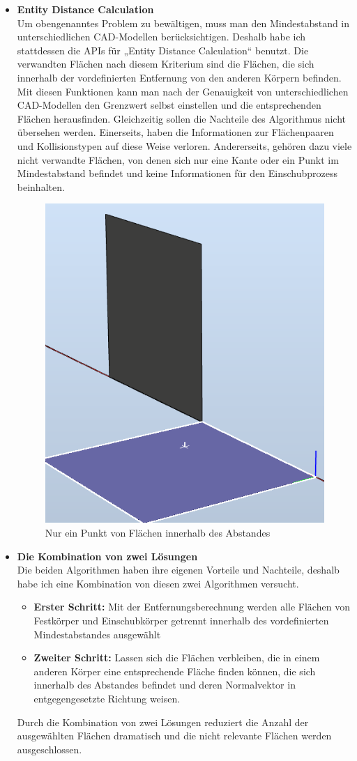 \documentclass[14pt,a4paper,titlepage]{article}
\begin{document}
\begin{itemize}
				 
				\item 
				\textbf{Entity Distance Calculation}
				\\ 
				Um obengenanntes Problem zu bewältigen, muss man den Mindestabstand in unterschiedlichen CAD-Modellen berücksichtigen. Deshalb habe ich stattdessen die APIs für „Entity Distance Calculation“ benutzt. Die verwandten Flächen nach diesem Kriterium sind die Flächen, die sich innerhalb der vordefinierten Entfernung von den anderen Körpern befinden. 
				\bigbreak
				Mit diesen Funktionen kann man nach der Genauigkeit von unterschiedlichen CAD-Modellen den Grenzwert selbst einstellen und die entsprechenden Flächen herausfinden. Gleichzeitig sollen die Nachteile des Algorithmus nicht übersehen werden. Einerseits, haben die Informationen zur Flächenpaaren und Kollisionstypen auf diese Weise verloren. Andererseits, gehören dazu viele nicht verwandte Flächen, von denen sich nur eine Kante oder ein Punkt im Mindestabstand befindet und keine Informationen für den Einschubprozess beinhalten. 
					\begin{figure}[h!]
					\centering
					\includegraphics[width=0.3\linewidth]{faces.png}
					\caption{Nur ein Punkt von Flächen innerhalb des Abstandes}
				\end{figure} 
				\pagebreak
				\item 
				\textbf{Die Kombination von zwei Lösungen} 
				\\
				Die beiden Algorithmen haben ihre eigenen Vorteile und Nachteile, deshalb habe ich eine Kombination von diesen zwei Algorithmen versucht. 
				\begin{itemize}
					\item \textbf{Erster Schritt:}
					Mit der Entfernungsberechnung werden alle Flächen von Festkörper und Einschubkörper getrennt innerhalb des vordefinierten Mindestabstandes ausgewählt
					\item \textbf{Zweiter Schritt:}
					Lassen sich die Flächen verbleiben, die in einem anderen Körper eine entsprechende Fläche finden können, die sich innerhalb des Abstandes befindet und deren Normalvektor in entgegengesetzte Richtung weisen.
				\end{itemize} 
			
				  Durch die Kombination von zwei Lösungen reduziert die Anzahl der ausgewählten Flächen dramatisch und die nicht relevante Flächen werden ausgeschlossen.     
			\end{itemize}
		
\end{document}
